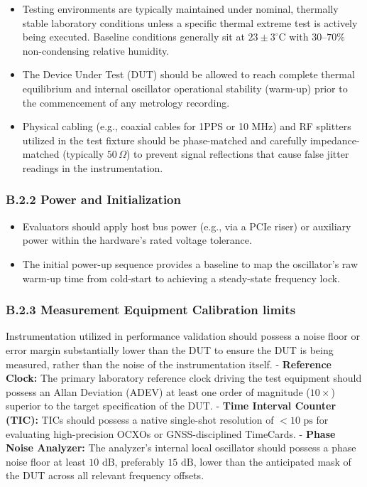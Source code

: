 \begin{itemize}
\tightlist
\item
  Testing environments are typically maintained under nominal, thermally
  stable laboratory conditions unless a specific thermal extreme test is
  actively being executed. Baseline conditions generally sit at
  \(23 \pm 3 ^\circ\text{C}\) with \(30\text{--}70\%\) non-condensing
  relative humidity.
\item
  The Device Under Test (DUT) should be allowed to reach complete
  thermal equilibrium and internal oscillator operational stability
  (warm-up) prior to the commencement of any metrology recording.
\item
  Physical cabling (e.g., coaxial cables for 1PPS or 10 MHz) and RF
  splitters utilized in the test fixture should be phase-matched and
  carefully impedance-matched (typically \(50\,\Omega\)) to prevent
  signal reflections that cause false jitter readings in the
  instrumentation.
\end{itemize}

\subsubsection{B.2.2 Power and
Initialization}\label{b.2.2-power-and-initialization}

\begin{itemize}
\tightlist
\item
  Evaluators should apply host bus power (e.g., via a PCIe riser) or
  auxiliary power within the hardware's rated voltage tolerance.
\item
  The initial power-up sequence provides a baseline to map the
  oscillator's raw warm-up time from cold-start to achieving a
  steady-state frequency lock.
\end{itemize}

\subsubsection{B.2.3 Measurement Equipment Calibration
limits}\label{b.2.3-measurement-equipment-calibration-limits}

Instrumentation utilized in performance validation should possess a
noise floor or error margin substantially lower than the DUT to ensure
the DUT is being measured, rather than the noise of the instrumentation
itself. - \textbf{Reference Clock:} The primary laboratory reference
clock driving the test equipment should possess an Allan Deviation
(ADEV) at least one order of magnitude (\(10\times\)) superior to the
target specification of the DUT. - \textbf{Time Interval Counter (TIC):}
TICs should possess a native single-shot resolution of \(<10\text{ ps}\)
for evaluating high-precision OCXOs or GNSS-disciplined TimeCards. -
\textbf{Phase Noise Analyzer:} The analyzer's internal local oscillator
should possess a phase noise floor at least \(10\text{ dB}\), preferably
\(15\text{ dB}\), lower than the anticipated mask of the DUT across all
relevant frequency offsets.

